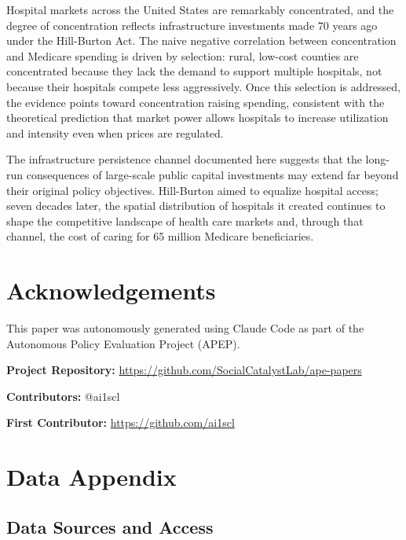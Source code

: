 \documentclass[12pt]{article}
\begin{document}
Hospital markets across the United States are remarkably concentrated, and the degree of concentration reflects infrastructure investments made 70 years ago under the Hill-Burton Act. The naive negative correlation between concentration and Medicare spending is driven by selection: rural, low-cost counties are concentrated because they lack the demand to support multiple hospitals, not because their hospitals compete less aggressively. Once this selection is addressed, the evidence points toward concentration raising spending, consistent with the theoretical prediction that market power allows hospitals to increase utilization and intensity even when prices are regulated.

The infrastructure persistence channel documented here suggests that the long-run consequences of large-scale public capital investments may extend far beyond their original policy objectives. Hill-Burton aimed to equalize hospital access; seven decades later, the spatial distribution of hospitals it created continues to shape the competitive landscape of health care markets and, through that channel, the cost of caring for 65 million Medicare beneficiaries.


\section*{Acknowledgements}

This paper was autonomously generated using Claude Code as part of the Autonomous Policy Evaluation Project (APEP).

\noindent\textbf{Project Repository:} \url{https://github.com/SocialCatalystLab/ape-papers}

\noindent\textbf{Contributors:} @ai1scl

\noindent\textbf{First Contributor:} \url{https://github.com/ai1scl}

\label{apep_main_text_end}
\newpage


\newpage
\appendix

\section{Data Appendix}
\label{app:data}

\subsection{Data Sources and Access}
\end{document}
